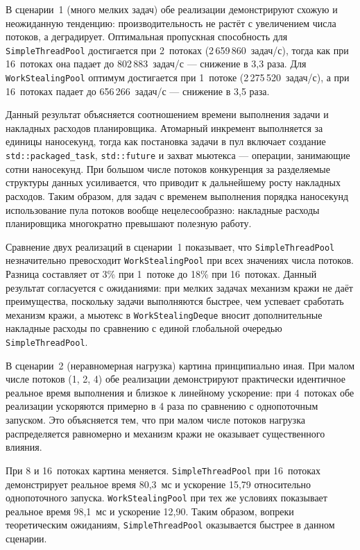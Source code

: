 В сценарии~1 (много мелких задач) обе реализации демонстрируют
схожую и неожиданную тенденцию: производительность не растёт
с увеличением числа потоков, а деградирует. Оптимальная
пропускная способность для \texttt{SimpleThreadPool} достигается
при 2~потоках (2\,659\,860~задач/с), тогда как при 16~потоках
она падает до 802\,883~задач/с --- снижение в 3,3 раза.
Для \texttt{WorkStealingPool} оптимум достигается при 1~потоке
(2\,275\,520~задач/с), а при 16~потоках падает до
656\,266~задач/с --- снижение в 3,5 раза.

Данный результат объясняется соотношением времени выполнения
задачи и накладных расходов планировщика. Атомарный инкремент
выполняется за единицы наносекунд, тогда как постановка задачи
в пул включает создание \texttt{std::packaged\_task},
\texttt{std::future} и захват мьютекса --- операции,
занимающие сотни наносекунд. При большом числе потоков
конкуренция за разделяемые структуры данных усиливается,
что приводит к дальнейшему росту накладных расходов. Таким
образом, для задач с временем выполнения порядка наносекунд
использование пула потоков вообще нецелесообразно: накладные
расходы планировщика многократно превышают полезную работу.

Сравнение двух реализаций в сценарии~1 показывает, что
\texttt{SimpleThreadPool} незначительно превосходит
\texttt{WorkStealingPool} при всех значениях числа потоков.
Разница составляет от 3\% при 1~потоке до 18\% при 16~потоках.
Данный результат согласуется с ожиданиями: при мелких задачах
механизм кражи не даёт преимущества, поскольку задачи
выполняются быстрее, чем успевает сработать механизм кражи,
а мьютекс в \texttt{WorkStealingDeque} вносит дополнительные
накладные расходы по сравнению с единой глобальной очередью
\texttt{SimpleThreadPool}.

В сценарии~2 (неравномерная нагрузка) картина принципиально
иная. При малом числе потоков (1, 2, 4) обе реализации
демонстрируют практически идентичное реальное время выполнения
и близкое к линейному ускорение: при 4~потоках обе реализации
ускоряются примерно в 4 раза по сравнению с однопоточным
запуском. Это объясняется тем, что при малом числе потоков
нагрузка распределяется равномерно и механизм
кражи не оказывает существенного влияния.

При 8 и 16~потоках картина меняется. \texttt{SimpleThreadPool}
при 16~потоках демонстрирует реальное время 80,3~мс и ускорение
15,79 относительно однопоточного запуска. \texttt{WorkStealingPool}
при тех же условиях показывает реальное время 98,1~мс и ускорение
12,90. Таким образом, вопреки теоретическим ожиданиям,
\texttt{SimpleThreadPool} оказывается быстрее в данном сценарии.

